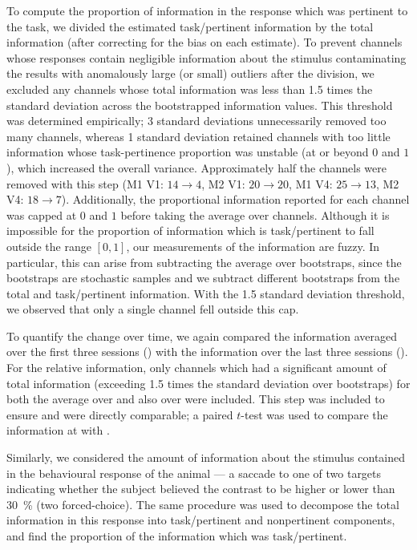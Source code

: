 To compute the proportion of information in the response which was pertinent to the task, we divided the estimated task\-/pertinent information by the total information (after correcting for the bias on each estimate).
To prevent channels whose responses contain negligible information about the stimulus contaminating the results with anomalously large (or small) outliers after the division, we excluded any channels whose total information was less than \num{1.5} times the standard deviation across the bootstrapped information values.
This threshold was determined empirically; \num{3} standard deviations unnecessarily removed too many channels, whereas \num{1} standard deviation retained channels with too little information whose task-pertinence proportion was unstable (at or beyond $0$ and $1$), which increased the overall variance.
Approximately half the channels were removed with this step (\ac{M1} \ac{V1}: $14\to4$, \ac{M2} \ac{V1}: $20\to20$, \ac{M1} \ac{V4}: $25\to13$, \ac{M2} \ac{V4}: $18\to7$).
Additionally, the proportional information reported for each channel was capped at $0$ and $1$ before taking the average over channels.
Although it is impossible for the proportion of information which is task\-/pertinent to fall outside the range $[0, 1]$, our measurements of the information are fuzzy.
In particular, this can arise from subtracting the average over bootstraps, since the bootstraps are stochastic samples and we subtract different bootstraps from the total and task\-/pertinent information.
With the \num{1.5} standard deviation threshold, we observed that only a single channel fell outside this cap.

To quantify the change over time, we again compared the information averaged over the first three sessions () with the information over the last three sessions ().
For the relative information, only channels which had a significant amount of total information (exceeding \num{1.5} times the standard deviation over bootstraps) for both the average over  and also over  were included.
This step was included to ensure  and  were directly comparable; a paired $t$-test was used to compare the information at  with .

Similarly, we considered the amount of information about the stimulus contained in the behavioural response of the animal --- a saccade to one of two targets indicating whether the subject believed the contrast to be higher or lower than \SI{30}{\percent} (two forced-choice).
The same procedure was used to decompose the total information in this response into task\-/pertinent and nonpertinent components, and find the proportion of the information which was task\-/pertinent.


